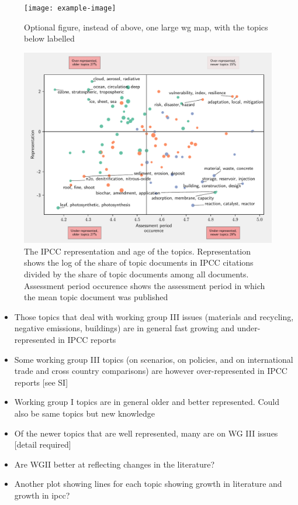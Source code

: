 \documentclass{article}
\begin{document}
\begin{figure}[h!]
	\begin{center}
		\texttt{[image: example-image]}
		\caption{Optional figure, instead of above, one large wg map, with the topics below labelled}
		\label{ipcc_rep}
	\end{center}
\end{figure}

\begin{figure}[h!]
	\begin{center}
		\includegraphics[width=0.85\linewidth]{plots/ipcc_representation/ipcc_rep_new1275_all.pdf}
		\caption{The IPCC representation and age of the topics. Representation shows the log of the share of topic documents in IPCC citations divided by the share of topic documents among all documents. Assessment period occurence shows the assessment period in which the mean topic document was published}
		\label{ipcc_rep}
	\end{center}
\end{figure}

\begin{itemize}
	\item Those topics that deal with working group III issues (materials and recycling, negative emissions, buildings) are in general fast growing and under-represented in IPCC reports
	\item Some working group III topics (on scenarios, on policies, and on international trade and cross country comparisons) are however over-represented in IPCC reports [see SI]
	\item Working group I topics are in general older and better represented. Could also be same topics but new knowledge
	\item Of the newer topics that are well represented, many are on WG III issues [detail required]
	\item Are WGII better at reflecting changes in the literature?
	\item Another plot showing lines for each topic showing growth in literature and growth in ipcc?
\end{itemize}
\end{document}
